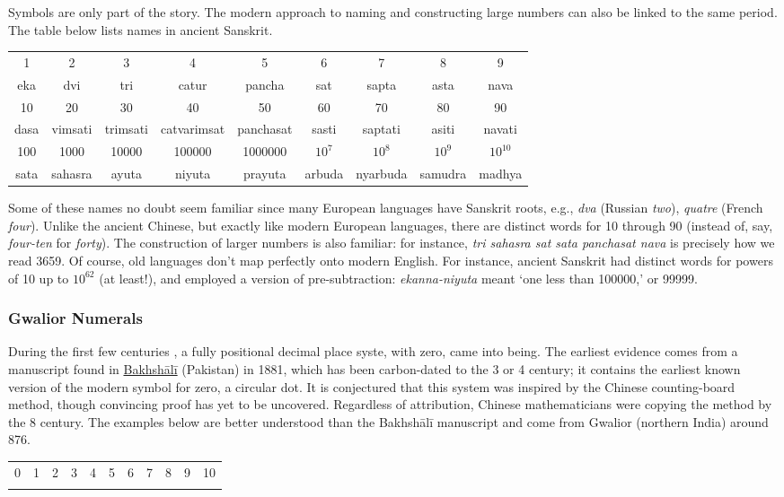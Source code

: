 Symbols are only part of the story. The modern approach to naming and constructing large numbers can also be linked to the same period. The table below lists names in ancient Sanskrit.
\begin{center}
	\begin{tabular}{@{}ccccccccc@{}}
		1&2&3&4&5&6&7&8&9\\
		eka&dvi&tri&catur&pancha&sat&sapta&asta&nava\\[0.3cm]
		10&20&30&40&50&60&70&80&90\\
		dasa&vimsati&trimsati&catvarimsat&panchasat&sasti&saptati&asiti&navati\\[0.3cm]
		100&1000&10000&100000&1000000&$10^7$&$10^8$&$10^9$&$10^{10}$\\
		sata&sahasra&ayuta&niyuta&prayuta&arbuda&nyarbuda&samudra&madhya
	\end{tabular}
\end{center}
Some of these names no doubt seem familiar since many European languages have Sanskrit roots, e.g., \emph{dva} (Russian \emph{two}), \emph{quatre} (French \emph{four}). Unlike the ancient Chinese, but exactly like modern European languages, there are distinct words for 10 through 90 (instead of, say, \emph{four-ten} for \emph{forty}). The construction of larger numbers is also familiar: for instance, \emph{tri sahasra sat sata panchasat nava} is precisely how we read 3659.
\smallbreak
Of course, old languages don't map perfectly onto modern English. For instance, ancient Sanskrit had distinct words for powers of 10 up to $10^{62}$ (at least!), and employed a version of pre-subtraction: \emph{ekanna-niyuta} meant `one less than 100000,' or 99999.


\subsubsection*{Gwalior Numerals}

During the first few centuries \AD{}\!, a fully positional decimal place syste, with zero, came into being. The earliest evidence comes from a manuscript found in \href{http://www.bbc.com/news/uk-england-oxfordshire-41265057}{Bakhshālī} (Pakistan) in 1881, which has been carbon-dated to the 3\rd{} or 4\th{} century; it contains the earliest known version of the modern symbol for zero, a circular dot. It is conjectured that this system was inspired by the Chinese counting-board method, though convincing proof has yet to be uncovered. Regardless of attribution, Chinese mathematicians were copying the method by the 8\th{} century.\smallbreak
The examples below are better understood than the Bakhshālī manuscript and come from Gwalior (northern India) around 876.
\begin{center}
	\begin{tabular}{ccccccccccc}
		0&1&2&3&4&5&6&7&8&9&10\\
		\IndiaGzero&\IndiaGone&\IndiaGtwo&\IndiaGthree&\IndiaGfour&\IndiaGfive&\IndiaGsix&\IndiaGseven&\IndiaGeight&\IndiaGnine&\IndiaGten
	\end{tabular}
\end{center}

